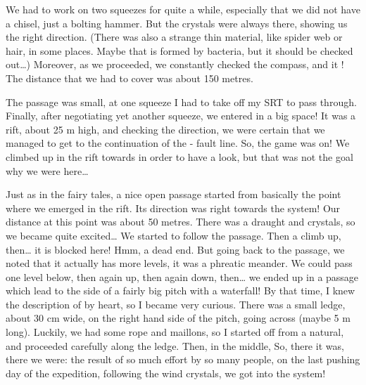 We had to work on two squeezes for quite a while, especially that we did
not have a chisel, just a bolting hammer. But the crystals were always
there, showing us the right direction. (There was also a strange thin
material, like spider web or hair, in some places. Maybe that is formed
by bacteria, but it should be checked out\ldots{}) Moreover, as we
proceeded, we constantly checked the compass, and it ! The distance that we had to cover
was about 150 metres.

The passage was small, at one squeeze I had to take off my SRT to pass
through. Finally, after negotiating yet another squeeze, we entered in a
big space! It was a rift, about 25 m high, and checking the direction,
we were certain that we managed to get to the continuation of the
- fault line. So, the game was on!
We climbed up in the rift towards  in order to have a
look, but that was not the goal why we were here\ldots{}


Just as in the fairy tales, a nice open passage started from basically
the point where we emerged in the rift. Its direction was right towards
the system! Our distance at this point was about 50 metres. There was a
draught and crystals, so we became quite excited\ldots{} We started to
follow the passage. Then a climb up, then\ldots{} it is blocked here!
Hmm, a dead end. But going back to the passage, we noted that it
actually has more levels, it was a phreatic meander. We could pass one
level below, then again up, then again down, then\ldots{} we ended up in
a passage which lead to the side of a fairly big pitch with a
waterfall! By that time, I knew the description of  by
heart, so I became very curious. There was a small ledge, about 30 cm
wide, on the right hand side of the pitch, going across (maybe 5 m
long). Luckily, we had some rope and maillons, so I started off from a
natural, and proceeded carefully along the ledge. Then, in the middle,
 So, there it
was, there we were: the result of so much effort by so many people, on
the last pushing day of the expedition, following the wind crystals, we
got into the system!

